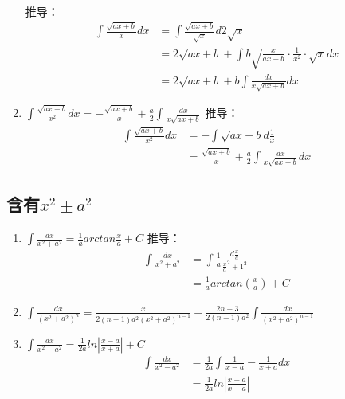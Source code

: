 \begin{enumerate}
	推导：
	\begin{equation}
		\begin{split}
			\int \frac{\sqrt{ax+b}}{x}dx&=\int \frac{\sqrt{ax+b}}{\sqrt{x}}d{2\sqrt{x}}\\ 
			&=2\sqrt{ax+b}+\int b\sqrt{\frac{x}{ax+b}}\cdot\frac{1}{x^2}\cdot\sqrt{x}d{x}\\ 
			&=2\sqrt{ax+b}+b\int\frac{dx}{x\sqrt{ax+b}}dx
		\end{split}
	\end{equation}
	\item $\int \frac{\sqrt{ax+b}}{x^2}dx=-\frac{\sqrt{ax+b}}{x}+\frac{a}{2}\int \frac{dx}{x\sqrt{ax+b}}$
	推导：
	\begin{equation}
		\begin{split}
			\int \frac{\sqrt{ax+b}}{x^2}dx&=-\int \sqrt{ax+b}d\frac{1}{x}\\ 
			&=\frac{\sqrt{ax+b}}{x}+\frac{a}{2}\int \frac{dx}{x\sqrt{ax+b}}dx
		\end{split}
	\end{equation}
\end{enumerate}
\subsection{含有$x^2\pm a^2$}
\begin{enumerate}
	\item $\int \frac{dx}{x^2+a^2}=\frac{1}{a}arctan\frac{x}{a}+C$
	推导：
	\begin{equation}
		\begin{split}
			\int \frac{dx}{x^2+a^2}&=\int \frac{1}{a}\frac{d\frac{x}{a}}{{\frac{x}{a}}^2+1^2}\\
			&=\frac{1}{a}arctan(\frac{x}{a})+C
		\end{split}
	\end{equation}
	\item $\int\frac{dx}{\left(x^2+a^2\right)^n}=\frac{x}{2(n-1)a^2(x^2+a^2)^{n-1}}+\frac{2n-3}{2(n-1)a^2}\int\frac{dx}{(x^2+a^2)^{n-1}}$
	\item $\int \frac{dx}{x^2-a^2}=\frac{1}{2a}ln|\frac{x-a}{x+a}|+C$
	\begin{equation}
		\begin{split}
			\int \frac{dx}{x^2-a^2}&=\frac{1}{2a}\int \frac{1}{x-a}-\frac{1}{x+a}dx\\ 
			&=\frac{1}{2a}ln|\frac{x-a}{x+a}|\
		\end{split}
	\end{equation}
\end{enumerate}
